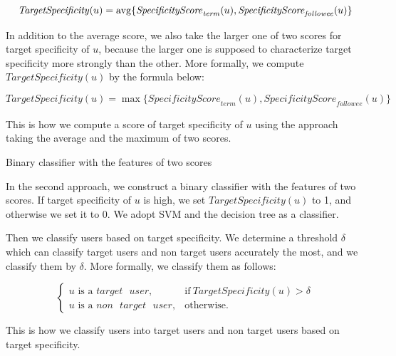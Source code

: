 \vspace{-4ex}
\[
 \mathit{TargetSpecificity}(u) = {\rm avg} \{
 \mathit{SpecificityScore}_{{\mathit{term}}}(u),
 \mathit{SpecificityScore}_{{\mathit{followee}}}(u)\}
\]
\vspace{-4ex}

In addition to the average score, we also take the larger one of two
scores for target specificity of $u$, because the larger one is supposed to
characterize target specificity more strongly than the other.  More
formally, we compute $\mathit{TargetSpecificity}(u)$ by the formula
below:

\vspace{-4ex}
\[
 \mathit{TargetSpecificity}(u) = \max \{
 \mathit{SpecificityScore}_{{\mathit{term}}}(u),
 \mathit{SpecificityScore}_{{\mathit{followee}}}(u)\}
\]
\vspace{-4ex}

This is how we compute a score of target specificity of $u$ using the
approach taking the average and the maximum of two scores.

\begin{description}
\bf{\item[(2)] Binary classifier with the features of two scores}
\label{item:Binary Classifier}
\end{description}

In the second approach, we construct a binary classifier with the features of
two scores.  If target specificity of $u$ is high, we set
$\mathit{TargetSpecificity}(u)$ to 1, and otherwise we set it to 0.  We
adopt SVM and the decision tree as a classifier.


Then we classify users based on target specificity.  We determine a
threshold $\delta$ which can classify target users and non target users
accurately the most, and we classify them by $\delta$.  More formally,
we classify them as follows:

\vspace{-1ex}
\[
\begin{cases}
u\mbox{ is a } \mathit{target}\mbox{ }\mathit{user}, & \mbox{if}\
\mathit{TargetSpecificity}(u) > \delta \\
u\mbox{ is a }\mathit{non}\mbox{ }\mathit{target}\mbox{ }\mathit{user}, & \mbox{otherwise}.
\end{cases}
\]
\vspace{-2ex}

This is how we classify users into target users and non target users
based on target specificity.